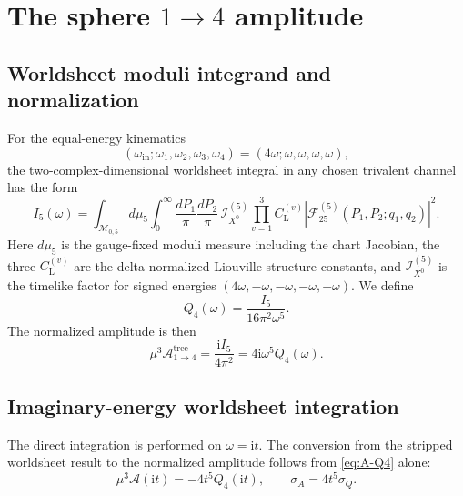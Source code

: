 \documentclass[11pt]{article}
\newcommand{\ii}{\mathrm{i}}
\newcommand{\A}{\mathcal{A}}
\begin{document}
\section{The sphere \texorpdfstring{$1\to4$}{1 to 4} amplitude}

\subsection{Worldsheet moduli integrand and normalization}

For the equal-energy kinematics
\begin{equation}
  (\omega_{\mathrm{in}};\omega_1,\omega_2,\omega_3,\omega_4)
  =(4\omega;\omega,\omega,\omega,\omega),
\end{equation}
the two-complex-dimensional worldsheet integral in any chosen trivalent
channel has the form
\begin{equation}
 I_5(\omega)=\int_{\mathcal M_{0,5}}d\mu_5
 \int_0^\infty\frac{dP_1}{\pi}\frac{dP_2}{\pi}\,
 \mathcal I_{X^0}^{(5)}
 \prod_{v=1}^{3}C_{\mathrm L}^{(v)}
 \left|\mathcal F_{25}^{(5)}(P_1,P_2;q_1,q_2)\right|^2 .
 \label{eq:I5-worldsheet-integrand}
\end{equation}
Here $d\mu_5$ is the gauge-fixed moduli measure including the chart
Jacobian, the three $C_{\mathrm L}^{(v)}$ are the delta-normalized Liouville
structure constants, and $\mathcal I_{X^0}^{(5)}$ is the timelike factor for
signed energies $(4\omega,-\omega,-\omega,-\omega,-\omega)$.
We define
\begin{equation}
  Q_4(\omega)=\frac{I_5}{16\pi^2\omega^5}.
  \label{eq:define-Q4}
\end{equation}
The normalized amplitude is then
\begin{equation}
  \mu^3\A^{\mathrm{tree}}_{1\to4}
  =\frac{\ii I_5}{4\pi^2}
  =4\ii\omega^5 Q_4(\omega).
  \label{eq:A-Q4}
\end{equation}

\subsection{Imaginary-energy worldsheet integration}

The direct integration is performed on $\omega=\ii t$.  The conversion from
the stripped worldsheet result to the normalized amplitude follows from
\eqref{eq:A-Q4} alone:
\begin{equation}
  \mu^3\A(\ii t)=-4t^5Q_4(\ii t),
  \qquad
  \sigma_A=4t^5\sigma_Q.
  \label{eq:error-conversion}
\end{equation}
\end{document}

